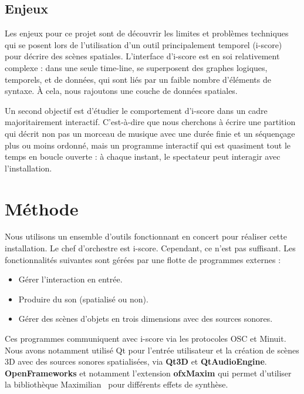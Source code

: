 \documentclass{article}
\begin{document}
    \subsection*{Enjeux}
    Les enjeux pour ce projet sont de découvrir les limites et problèmes techniques qui se posent lors de l'utilisation d'un outil principalement temporel (i-score) pour décrire des scènes spatiales.
    L'interface d'i-score est en soi relativement complexe : dans une seule time-line, se superposent des graphes logiques, temporels, et de données, qui sont liés par un faible nombre d'éléments de syntaxe.
    À cela, nous rajoutons une couche de données spatiales.
    
    Un second objectif est d'étudier le comportement d'i-score dans un cadre majoritairement interactif.
    C'est-à-dire que nous cherchons à écrire une partition qui décrit non pas un morceau de musique avec une durée finie et un séquençage plus ou moins ordonné, mais un programme interactif qui est quasiment tout le temps en boucle ouverte : à chaque instant, le spectateur peut interagir avec l'installation. 
    
    \section*{Méthode}
    Nous utilisons un ensemble d'outils fonctionnant en concert pour réaliser cette installation.
    Le chef d'orchestre est i-score.
    Cependant, ce n'est pas suffisant.
    Les fonctionnalités suivantes sont gérées par une flotte de programmes externes : 
    \begin{itemize}
        \item Gérer l'interaction en entrée.
        \item Produire du son (spatialisé ou non).
        \item Gérer des scènes d'objets en trois dimensions avec des sources sonores.
    \end{itemize}
    
    Ces programmes communiquent avec i-score via les protocoles OSC et Minuit.
    Nous avons notamment utilisé Qt pour l'entrée utilisateur et la création de scènes 3D avec des sources sonores spatialisées, via \textbf{Qt3D} et \textbf{QtAudioEngine}.
    \textbf{OpenFrameworks} et notamment l'extension \textbf{ofxMaxim} qui permet d'utiliser la bibliothèque Maximilian~\cite{grierson2010maximilian} pour différents effets de synthèse.
    
\end{document}
